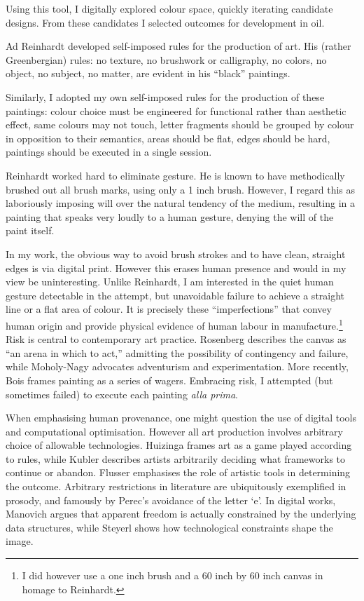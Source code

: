 \documentclass[12pt]{article}
\begin{document}
Using this tool, I digitally explored colour space, quickly iterating
candidate designs. From these candidates I selected outcomes for
development in oil.

Ad Reinhardt developed self-imposed rules for the production of
art.\cite[p. 203-7]{artasart} His (rather Greenbergian) rules: no
texture, no brushwork or calligraphy, no colors, no object, no
subject, no matter, are evident in his ``black'' paintings.

Similarly, I adopted my own self-imposed rules for the production of
these paintings: colour choice must be engineered for functional
rather than aesthetic effect, same colours may not touch, letter
fragments should be grouped by colour in opposition to their
semantics, areas should be flat, edges should be hard, paintings
should be executed in a single session.

Reinhardt worked hard to eliminate gesture. He is known to have
methodically brushed out all brush marks, using only a 1 inch
brush.\cite[p. 206]{artasart} However, I regard this as 
laboriously imposing will over the natural tendency of the medium,
resulting in a painting that speaks very loudly to a human gesture,
denying the will of the paint itself.

In my work, the obvious way to avoid brush strokes and to have clean,
straight edges is via digital print. However this erases human
presence and would in my view be uninteresting. Unlike Reinhardt, I am
interested in the quiet human gesture detectable in the attempt, but
unavoidable failure to achieve a straight line or a flat area of
colour. It is precisely these ``imperfections'' that convey human
origin and provide physical evidence of human labour in
manufacture.\footnote{I did however use a one inch brush and a 60 inch
  by 60 inch canvas in homage to Reinhardt.} Risk is central to
contemporary art practice. Rosenberg describes the canvas as ``an
arena in which to act,''\cite[p. 22]{rosenberg1952american} admitting
the possibility of contingency and failure, while Moholy-Nagy
advocates adventurism and
experimentation\cite[p. 274-6]{moholy1947vision}. More recently, Bois
frames painting as a series of wagers.\cite[p. 229]{bois1990painting}
Embracing risk, I attempted (but sometimes failed) to execute each
painting \emph{alla prima}.

When emphasising human provenance, one might question the use of
digital tools and computational optimisation. However all art
production involves arbitrary choice of allowable
technologies. Huizinga frames art as a game played according to
rules,\cite{huizinga1938homo} while Kubler describes artists
arbitrarily deciding what frameworks to continue or
abandon.\cite{kubler1962shape} Flusser emphasises the role of artistic
tools in determining the outcome.\cite{flusser2000towards} Arbitrary
restrictions in literature are ubiquitously exemplified in prosody,
and famously by Perec's avoidance of the letter
`e'.\cite{perec1969disparition} In digital works, Manovich argues that apparent freedom is actually constrained by the underlying data structures\cite{manovich2001language}, while Steyerl shows how technological constraints shape the image\cite{steyerl2009poorimage}.
\end{document}
